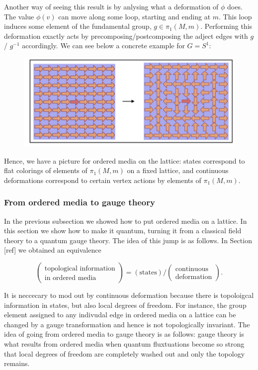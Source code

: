 \documentclass{article}
\theoremstyle{definition}
\numberwithin{figure}{section}
\begin{document}
Another way of seeing this result is by anlysing what a deformation of $\phi$ does. The value $\phi(v)$ can move along some loop, starting and ending at $m$. This loop induces some element of the fundamental group, $g\in \pi_1(M,m)$. Performing this deformation exactly acts by precomposing/postcomposing the adject edges with $g$/ $g^{-1}$ accordingly. We can see below a concrete example for $G=S^{1}$:

\begin{figure}[h]
\begin{center}
\includegraphics[scale=.45]{twisting}
\end{center}
\end{figure}

Hence, we have a picture for ordered media on the lattice: states correspond to flat colorings of elements of $\pi_1(M,m)$ on a fixed lattice, and continuous deformations correspond to certain vertex actions by elements of $\pi_1(M,m)$.

\subsubsection{From ordered media to gauge theory}

In the previous subsection we showed how to put ordered media on a lattice. In this section we show how to make it quantum, turning it from a classical field theory to a quantum gauge theory. The idea of this jump is as follows. In Section [ref] we obtained an equivalence

$$
\left(\substack{\text{topological information}\\ \text{in ordered media}}\right)=\left(\text{states}\right)/\left(\substack{\text{continuous} \\ \text{deformation}}\right).
$$

It is neccecary to mod out by continuous deformation because there is topoloigcal information in states, but also local degrees of freedom. For instance, the group element assigned to any indivudal edge in ordered media on a lattice can be changed by a gauge transformation and hence is not topologically invariant. The idea of going from ordered media to gauge theory is as follows: gauge theory is what results from ordered media when quantum fluxtuations become so strong that local degrees of freedom are completely washed out and only the topology remains.
\end{document}
